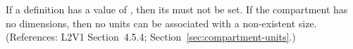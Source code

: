 If a \Compartment definition has a  value
of , then its   must not be set. If the
compartment has no dimensions, then no units can be associated
with a non-existent size.  (References: L2V1 Section~4.5.4;
Section~\ref{sec:compartment-units}.)
